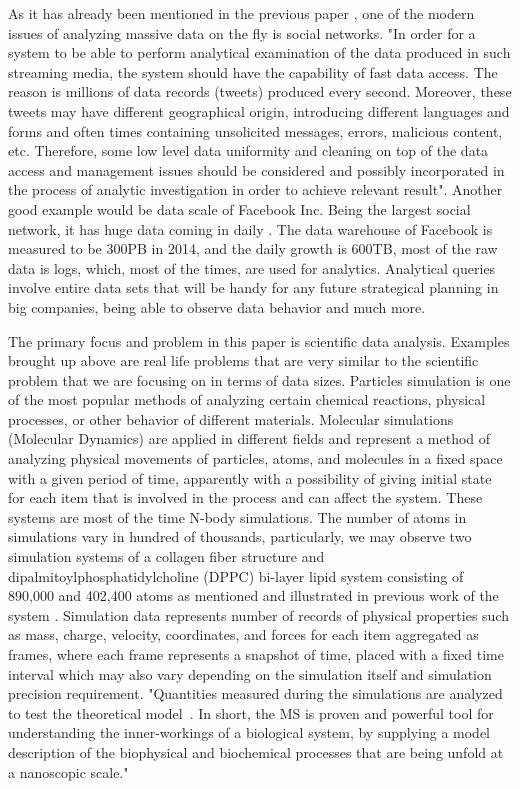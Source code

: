 \documentclass[12pt,letterpaper]{report}
\begin{document}
\noindent\hspace{3em}As it has already been mentioned in the previous paper \cite{mainPaper}, one of the modern issues of analyzing massive data on the fly is social networks. "In order for a system to be able to perform analytical examination of the data produced in such streaming media, the system should have the capability of fast data access. The reason is millions of data records (tweets) produced every second. Moreover, these tweets may have different geographical origin, introducing different languages and forms and often times containing unsolicited messages, errors,
malicious content, etc. Therefore, some low level data uniformity
and cleaning on top of the data access and management issues should
be considered and possibly incorporated in the process of analytic
investigation in order to achieve relevant result".\cite{mainPaper, nature_bigdata08,nature_bigdata12,science_social10,jcs_twitter11} Another good example would be data scale of Facebook Inc. Being the largest social network, it has huge data coming in daily \cite{fbStats}. The data warehouse of Facebook is measured to be 300PB in 2014, and the daily growth is 600TB, most of the raw data is logs, which, most of the times, are used for analytics. Analytical queries involve entire data sets that will be handy for any future strategical planning in big companies, being able to observe data behavior and much more.

\noindent\hspace{3em}The primary focus and problem in this paper is scientific data analysis. Examples brought up above are real life problems that are very similar to the scientific problem that we are focusing on in terms of data sizes. Particles simulation is one of the most popular methods of analyzing certain chemical reactions, physical processes, or other behavior of different materials.
Molecular simulations (Molecular Dynamics) are applied in different fields and represent a method of analyzing physical movements of particles, atoms, and molecules in a fixed space with a given period of time, apparently with a possibility of giving initial state for each item that is involved in the process and can affect the system. These systems are most of the time N-body simulations. The number of atoms in simulations vary in hundred of thousands, particularly, we may observe two simulation systems of a collagen fiber structure and dipalmitoylphosphatidylcholine (DPPC) bi-layer lipid system consisting of 890,000 and 402,400 atoms as mentioned and illustrated in previous work of the system \cite{mainPaper}. Simulation data represents number of records of physical properties such as mass, charge, velocity, coordinates, and forces for each item aggregated as frames, where each frame represents a snapshot of time, placed with a fixed time interval which may also vary depending on the simulation itself and simulation precision requirement. "Quantities measured during the simulations are analyzed to test the theoretical
model~\cite{Frenkel:api01,Landau:cup05}. In short, the MS is proven
and powerful tool for understanding the inner-workings of a
biological system, by supplying a model description of the
biophysical and biochemical processes that are being unfold at a
nanoscopic scale." \cite{mainPaper}
\clearpage
\end{document}
